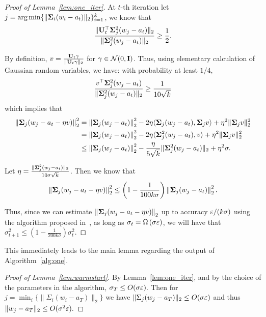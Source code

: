 \begin{proof}[Proof of Lemma~\ref{lem:one_iter}]
At $t$-th iteration let $j = \operatorname*{arg\,min} \{ \|\bold{\Sigma}_i (w_i - a_t) \|_2\}_{i = 1}^k$, we know that 
\begin{align}
\frac{\|\bold{U}_t^{\top} \bold{\Sigma}_j^2 (w_j - a_t) \|_2}{\| \bold{\Sigma}_j^2 (w_j - a_t)  \|_2 } \geq \frac{1}{2}.
\end{align}

By definition, $v = \frac{\bold{U}_t \gamma}{\| \bold{U}_t \gamma \|_2}$ for $\gamma \in \mathcal{N}(0, \bold{I})$. Thus, using elementary calculation of Gaussian random variables, we have: with probability at least $1/4$, 
\begin{align}
\frac{v^{\top} \bold{\Sigma}_j^2 (w_j - a_t) }{ \| \bold{\Sigma}_j^2 (w_j- a_t)  \|_2 } \geq \frac{1}{10 \sqrt{k}}
\end{align}
which implies that
\begin{align}
\left\|\bold{\Sigma}_j (w_j - a_t  - \eta  v) \right\|_2^2 &= \left\|\bold{\Sigma}_j (w_j - a_t ) \right\|_2^2 - 2  \eta \langle \bold{\Sigma}_j (w_j - a_t), \bold{\Sigma}_j  v\rangle + \eta^2 \| \bold{\Sigma}_j  v \|_2^2
\\
&=  \left\|\bold{\Sigma}_j (w_j - a_t ) \right\|_2^2  - 2 \eta \langle \bold{\Sigma}_j^2 (w_j - a_t),  v\rangle + \eta^2 \| \bold{\Sigma}_j  v \|_2^2
\\
& \leq  \left\|\bold{\Sigma}_j (w_j - a_t ) \right\|_2^2  - \frac{\eta}{5 \sqrt{k}} \| \bold{\Sigma}_j^2 (w_j - a_t) \|_2 + \eta^2  \sigma.
\end{align}


Let $\eta = \frac{\| \bold{\Sigma}_j^2 (w_j - a_t) \|_2 }{10 \sigma \sqrt{k}}$. Then we know that 
$$
\left\|\bold{\Sigma}_j (w_j - a_t  - \eta v) \right\|_2^2 \leq \left(1 - \frac{1}{100 k \sigma} \right)  \left\|\bold{\Sigma}_j (w_j - a_t ) \right\|_2^2.
$$


Thus, since we can estimate $\left\|\bold{\Sigma}_j (w_j - a_t  - \eta  v) \right\|_2$ up to accuracy $\varepsilon/(k\sigma)$ using the algorithm proposed in~\citep{moitra2010settling}, as long as $\sigma_{t} = \Omega\left( \sigma\varepsilon \right)$, we will have that $\sigma_{t + 1}^2 \leq  \left(1 - \frac{1}{200 k \sigma} \right)\sigma_t^2$. 
\end{proof}

This immediately leads to the main lemma regarding the output of Algorithm~\ref{alg:one}.



\begin{proof}[Proof of Lemma~\ref{lem:warmstart}]
By Lemma~\ref{lem:one_iter}, and by the choice of the parameters in the algorithm,
$
  \sigma_T \le O(\sigma \varepsilon).
$
Then for $j = \min_i \{\|\Sigma_i (w_i - a_T)\|_2\}$ we have 
$
  \|\Sigma_j (w_j - a_T)\|_2 \le O(\sigma \varepsilon)
$
and thus
$ 
  \|w_j - a_T\|_2 \le O(\sigma^2 \varepsilon).
$
\end{proof}

